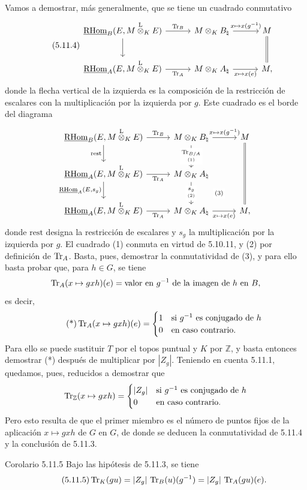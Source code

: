 Vamos a demostrar, más generalmente, que se tiene un cuadrado conmutativo
\begin{equation}\tag{5.11.4}
\begin{tikzcd}[column sep=3.0em,row sep=2.2em]
\uRHom_B(E,M\lten_KE) \arrow[r,"\Tr_B"] \arrow[d] &
M\otimes_KB_\natural \arrow[r,"{x\mapsto x(g^{-1})}"] &
M \arrow[d,equal] \\
\uRHom_A(E,M\lten_KE) \arrow[r,"\Tr_A"'] &
M\otimes_KA_\natural \arrow[r,"{x\mapsto x(e)}"'] &
M,
\end{tikzcd}
\end{equation}
donde la flecha vertical de la izquierda es la composición de la restricción de escalares con la multiplicación por la izquierda por $g$. Este cuadrado es el borde del diagrama
\[
\begin{tikzcd}[column sep=2.8em,row sep=2.0em]
\uRHom_B(E,M\lten_KE) \arrow[r,"\Tr_B"] \arrow[d,"\mathrm{rest}"'] &
M\otimes_KB_\natural \arrow[r,"{x\mapsto x(g^{-1})}"] \arrow[d,"{\underset{(1)}{\Tr_{B/A}}}" description] &
M \arrow[dd,equal] \\
\uRHom_A(E,M\lten_KE) \arrow[r,"\Tr_A"'] \arrow[d,"{\uRHom_A(E,s_g)}"'] &
M\otimes_KA_\natural \arrow[d,"{\underset{(2)}{s_g}}" description] \arrow[dr,phantom,"\scriptstyle(3)" description] &
\\
\uRHom_A(E,M\lten_KE) \arrow[r,"\Tr_A"'] &
M\otimes_KA_\natural \arrow[r,"{x\mapsto x(e)}"'] &
M,
\end{tikzcd}
\]
donde $\mathrm{rest}$ designa la restricción de escalares y $s_g$ la multiplicación por la izquierda por $g$. El cuadrado (1) conmuta en virtud de 5.10.11, y (2) por definición de $\operatorname{Tr}_A$. Basta, pues, demostrar la conmutatividad de (3), y para ello basta probar que, para $h\in G$, se tiene
\[
\operatorname{Tr}_A(x\mapsto gxh)(e)=\text{valor en }g^{-1}\text{ de la imagen de }h\text{ en }B,
\]
es decir,
\begin{equation}\tag{*}
\operatorname{Tr}_A(x\mapsto gxh)(e)=
\begin{cases}
1 & \text{si } g^{-1}\text{ es conjugado de }h\\
0 & \text{en caso contrario}.
\end{cases}
\end{equation}
Para ello se puede sustituir $T$ por el topos puntual y $K$ por $\mathbb Z$, y basta entonces demostrar (*) después de multiplicar por $|Z_g|$. Teniendo en cuenta 5.11.1, quedamos, pues, reducidos a demostrar que
\[
\operatorname{Tr}_{\mathbb Z}(x\mapsto gxh)=
\begin{cases}
|Z_g| & \text{si } g^{-1}\text{ es conjugado de }h\\
0 & \text{en caso contrario}.
\end{cases}
\]
Pero esto resulta de que el primer miembro es el número de puntos fijos de la aplicación $x\mapsto gxh$ de $G$ en $G$, de donde se deducen la conmutatividad de 5.11.4 y la conclusión de 5.11.3.

\begin{statement}{Corolario 5.11.5}
Bajo las hipótesis de 5.11.3, se tiene
\begin{equation}\tag{5.11.5}
\operatorname{Tr}_K(gu)=|Z_g|\,\operatorname{Tr}_B(u)(g^{-1})=|Z_g|\,\operatorname{Tr}_A(gu)(e).
\end{equation}
\end{statement}
